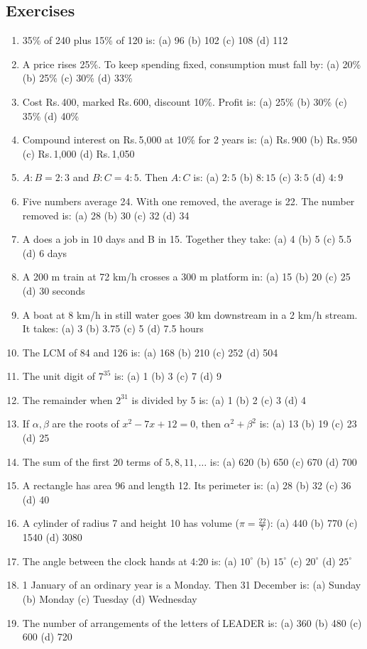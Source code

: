 \documentclass[11pt,a4paper,openany]{report}
\newenvironment{exercises}{\subsection*{Exercises \thechapter}\begin{enumerate}[label=\textbf{\thechapter.\arabic*},leftmargin=3.2em]}{\end{enumerate}}
\newcommand{\Rs}{Rs.\,}
\begin{document}
\begin{exercises}
\item 35\% of 240 plus 15\% of 120 is: (a) 96 (b) 102 (c) 108 (d) 112
\item A price rises 25\%. To keep spending fixed, consumption must fall by: (a) 20\% (b) 25\% (c) 30\% (d) 33\%
\item Cost \Rs400, marked \Rs600, discount 10\%. Profit is: (a) 25\% (b) 30\% (c) 35\% (d) 40\%
\item Compound interest on \Rs5,000 at 10\% for 2 years is: (a) \Rs900 (b) \Rs950 (c) \Rs1,000 (d) \Rs1,050
\item $A:B=2:3$ and $B:C=4:5$. Then $A:C$ is: (a) $2:5$ (b) $8:15$ (c) $3:5$ (d) $4:9$
\item Five numbers average 24. With one removed, the average is 22. The number removed is: (a) 28 (b) 30 (c) 32 (d) 34
\item A does a job in 10 days and B in 15. Together they take: (a) 4 (b) 5 (c) 5.5 (d) 6 days
\item A 200 m train at 72 km/h crosses a 300 m platform in: (a) 15 (b) 20 (c) 25 (d) 30 seconds
\item A boat at 8 km/h in still water goes 30 km downstream in a 2 km/h stream. It takes: (a) 3 (b) 3.75 (c) 5 (d) 7.5 hours
\item The LCM of 84 and 126 is: (a) 168 (b) 210 (c) 252 (d) 504
\item The unit digit of $7^{35}$ is: (a) 1 (b) 3 (c) 7 (d) 9
\item The remainder when $2^{31}$ is divided by 5 is: (a) 1 (b) 2 (c) 3 (d) 4
\item If $\alpha,\beta$ are the roots of $x^2-7x+12=0$, then $\alpha^2+\beta^2$ is: (a) 13 (b) 19 (c) 23 (d) 25
\item The sum of the first 20 terms of $5,8,11,\dots$ is: (a) 620 (b) 650 (c) 670 (d) 700
\item A rectangle has area 96 and length 12. Its perimeter is: (a) 28 (b) 32 (c) 36 (d) 40
\item A cylinder of radius 7 and height 10 has volume ($\pi=\frac{22}7$): (a) 440 (b) 770 (c) 1540 (d) 3080
\item The angle between the clock hands at 4:20 is: (a) $10^\circ$ (b) $15^\circ$ (c) $20^\circ$ (d) $25^\circ$
\item 1 January of an ordinary year is a Monday. Then 31 December is: (a) Sunday (b) Monday (c) Tuesday (d) Wednesday
\item The number of arrangements of the letters of LEADER is: (a) 360 (b) 480 (c) 600 (d) 720

\end{exercises}
\end{document}
